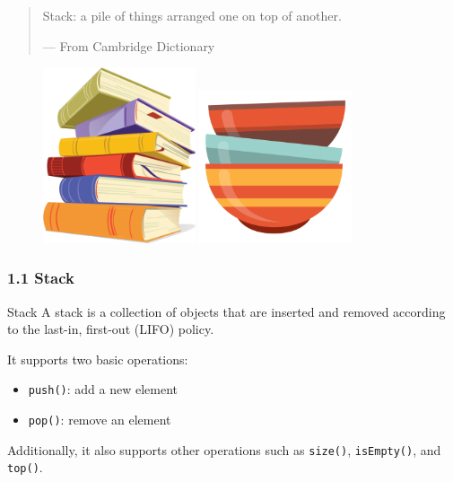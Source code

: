 \documentclass[aspectratio=169, 14pt]{beamer}
\begin{document}
\begin{frame}
	\begin{quote}
		Stack: a pile of things arranged one on top of another.
		\begin{flushright}
			--- From Cambridge Dictionary
		\end{flushright}
	\end{quote}
	\begin{figure}
		\includegraphics[width=0.4\textwidth, height=0.4\paperheight]{week3/book}
		\hfill
		\includegraphics[width=0.4\textwidth, height=0.4\paperheight]{week3/tray}
	\end{figure}

\end{frame}

\begin{frame}
	\frametitle{1.1 Stack}
	\begin{exampleblock}{Stack}
		A stack is a collection of objects that are inserted and removed according to the \alert{last-in, first-out (LIFO)} policy.
	\end{exampleblock}
	It supports two basic operations:
	\begin{itemize}
		\item \texttt{push()}: add a new element
		\item \texttt{pop()}: remove an element
	\end{itemize}
	Additionally, it also supports other operations such as \texttt{size()}, \texttt{isEmpty()}, and \texttt{top()}.
\end{frame}
\end{document}
